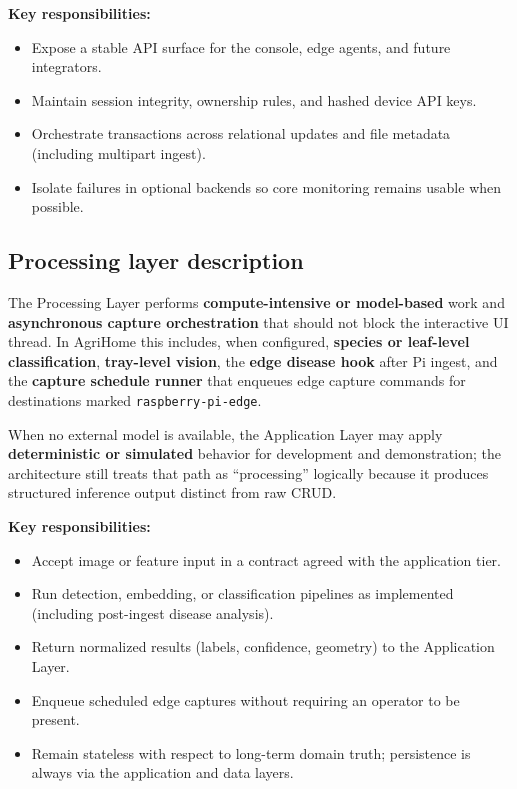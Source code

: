 \textbf{Key responsibilities:}
\begin{itemize}
  \item Expose a stable API surface for the console, edge agents, and future integrators.
  \item Maintain session integrity, ownership rules, and hashed device API keys.
  \item Orchestrate transactions across relational updates and file metadata (including multipart ingest).
  \item Isolate failures in optional backends so core monitoring remains usable when possible.
\end{itemize}

\subsection{Processing layer description}

The Processing Layer performs \textbf{compute-intensive or model-based} work and \textbf{asynchronous capture orchestration} that should not block the interactive UI thread. In AgriHome this includes, when configured, \textbf{species or leaf-level classification}, \textbf{tray-level vision}, the \textbf{edge disease hook} after Pi ingest, and the \textbf{capture schedule runner} that enqueues edge capture commands for destinations marked \texttt{raspberry-pi-edge}.

When no external model is available, the Application Layer may apply \textbf{deterministic or simulated} behavior for development and demonstration; the architecture still treats that path as ``processing'' logically because it produces structured inference output distinct from raw CRUD.

\textbf{Key responsibilities:}
\begin{itemize}
  \item Accept image or feature input in a contract agreed with the application tier.
  \item Run detection, embedding, or classification pipelines as implemented (including post-ingest disease analysis).
  \item Return normalized results (labels, confidence, geometry) to the Application Layer.
  \item Enqueue scheduled edge captures without requiring an operator to be present.
  \item Remain stateless with respect to long-term domain truth; persistence is always via the application and data layers.
\end{itemize}

